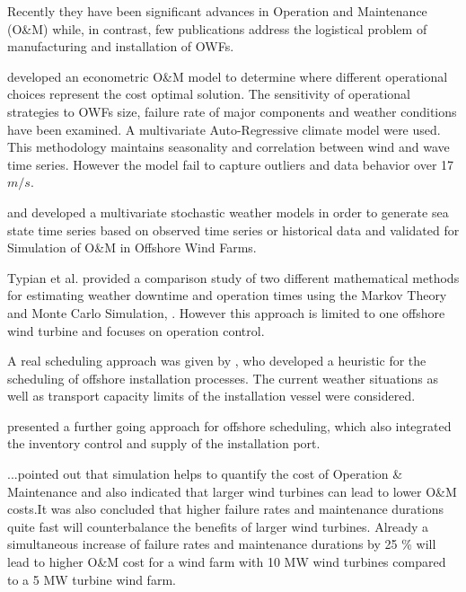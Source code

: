 Recently they have been significant advances in Operation and Maintenance (O\&M) while, in contrast, few publications address the logistical problem of manufacturing and installation of OWFs.

\cite{dinwoodie2013} developed an econometric O\&M model to determine where different operational choices represent the cost optimal solution. The sensitivity of operational strategies to OWFs size, failure rate of major components and weather conditions have been examined. A multivariate Auto-Regressive climate model were used. This methodology maintains seasonality and correlation between wind and wave time series. However the model fail to capture outliers and data behavior over 17 $m/s$.


\cite{Hagen2013} and \cite{scheu2012} developed  a multivariate stochastic weather models in order to generate sea state time series based on observed time series or historical data and validated for Simulation of O\&M in Offshore Wind Farms. 


Typian et al. provided a comparison study of two different mathematical methods for estimating weather downtime and operation times using the Markov Theory and Monte Carlo Simulation, \cite{Tyapin2011}. However this approach is limited to one offshore wind turbine and focuses on operation control.




A real scheduling approach was given by \cite{Scholz2010}, who developed a heuristic for the scheduling of offshore installation processes. The current weather situations as well as transport capacity limits of the installation vessel were considered.



\cite{ISOPE2012} presented a further going approach for offshore scheduling, which also integrated the inventory control and supply of the installation port.




\cite{Hofmann2014} ...pointed out that simulation helps to quantify the cost of Operation \& Maintenance  and also indicated that larger wind turbines can lead to lower O\&M costs.It was also concluded that higher failure rates and maintenance durations quite fast will counterbalance the benefits of larger wind turbines. Already a simultaneous increase of failure rates and maintenance durations by 25 \% will lead to higher O\&M cost for a wind farm with 10 MW wind turbines compared to a 5 MW turbine wind farm. 



